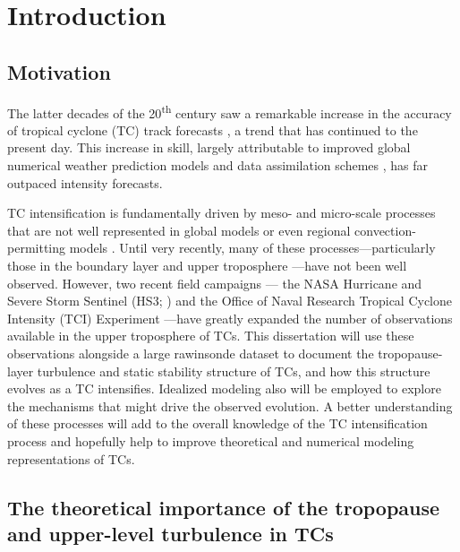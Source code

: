 \chapter{Introduction}
\label{intro}

\section{Motivation}

\indent The latter decades of the 20\textsuperscript{th} century saw a remarkable increase in the accuracy of tropical cyclone (TC) track forecasts \citep{PowellAberson2001}, a trend that has continued to the present day.
This increase in skill, largely attributable to improved global numerical weather prediction models and data assimilation schemes \citep{Galletal2013}, has far outpaced intensity forecasts.

TC intensification is fundamentally driven by meso- and micro-scale processes that are not well represented in global models or even regional convection-permitting models \citep{Rogersetal2006}.
Until very recently, many of these processes---particularly those in the boundary layer \citep{Blacketal2007} and upper troposphere \citep{DoyleTCI}---have not been well observed.
However, two recent field campaigns --- the NASA Hurricane and Severe Storm Sentinel (HS3; \citeauthor{Braunetal2016} \citeyear{Braunetal2016}) and the Office of Naval Research Tropical Cyclone Intensity (TCI) Experiment \citep{DoyleTCI}---have greatly expanded the number of observations available in the upper troposphere of TCs.
This dissertation will use these observations alongside a large rawinsonde dataset to document the tropopause-layer turbulence and static stability structure of TCs, and how this structure evolves as a TC intensifies.
Idealized modeling also will be employed to explore the mechanisms that might drive the observed evolution.
A better understanding of these processes will add to the overall knowledge of the TC intensification process and hopefully help to improve theoretical and numerical modeling representations of TCs.

\section{The theoretical importance of the tropopause and upper-level turbulence in TCs}
 
